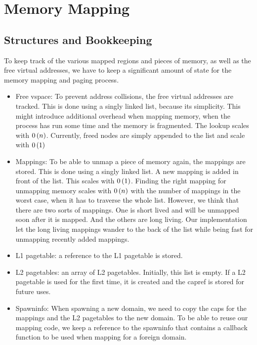 \section{Memory Mapping}\label{s:mapping}

\subsection{Structures and Bookkeeping}\label{ss:mapping_structures}

To keep track of the various mapped regions and pieces of memory, as well as 
the free virtual addresses, we have to keep a significant amount of state for 
the memory mapping and paging process.

\begin{itemize}
	\item Free vspace: To prevent address collisions, the free virtual 
    addresses are tracked. This is done using a singly linked list, because 
    its simplicity. This might introduce additional overhead when mapping 
    memory, when the process has run some time and the memory is fragmented. 
    The lookup scales with $0\left( n \right)$. Currently, freed nodes are simply 
    appended to the list and scale with $0\left( 1 \right)$ 

	\item Mappings: To be able to unmap a piece of memory again, the mappings 
    are stored. This is done using a singly linked list. A new mapping is 
    added in front of the list. This scales with $0\left( 1 \right)$. Finding the 
    right mapping for unmapping memory scales with $0\left( n \right)$ with the 
    number of mappings in the worst case, when it has to traverse the whole 
    list. However, we think that there are two sorts of mappings. One is short 
    lived and will be unmapped soon after it is mapped. And the others are 
    long living. Our implementation let the long living mappings wander to the 
    back of the list while being fast for unmapping recently added mappings.

	\item L1 pagetable: a reference to the L1 pagetable is stored.

	\item L2 pagetables: an array of L2 pagetables. Initially, this list is 
    empty. If a L2 pagetable is used for the first time, it is created and the 
    capref is stored for future uses.

	\item Spawninfo: When spawning a new domain, we need to copy the caps for 
    the mappings and the L2 pagetables to the new domain. To be able to reuse 
    our mapping code, we keep a reference to the spawninfo that contains a 
    callback function to be used when mapping for a foreign domain.
\end{itemize}

